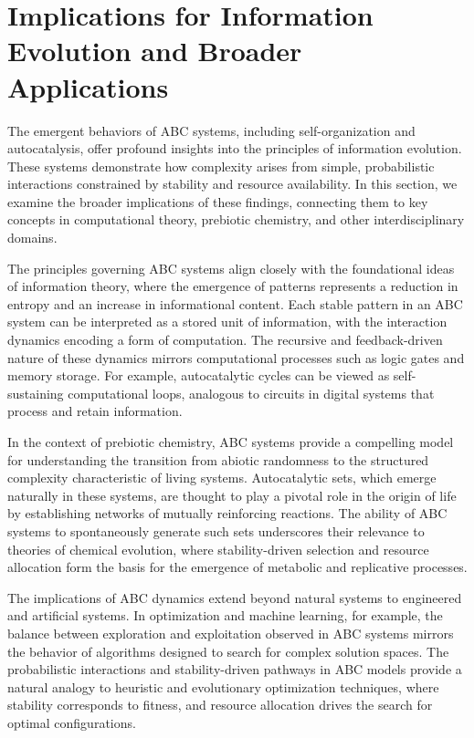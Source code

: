 \documentclass[%
 preprint, linenumbers,
 amsmath,amssymb,
 aps, physrev,
]{revtex4-2}
\begin{document}
\section{Implications for Information Evolution and Broader Applications}

The emergent behaviors of ABC systems, including self-organization and autocatalysis, offer profound insights into the principles of information evolution. These systems demonstrate how complexity arises from simple, probabilistic interactions constrained by stability and resource availability. In this section, we examine the broader implications of these findings, connecting them to key concepts in computational theory, prebiotic chemistry, and other interdisciplinary domains.

The principles governing ABC systems align closely with the foundational ideas of information theory, where the emergence of patterns represents a reduction in entropy and an increase in informational content. Each stable pattern in an ABC system can be interpreted as a stored unit of information, with the interaction dynamics encoding a form of computation. The recursive and feedback-driven nature of these dynamics mirrors computational processes such as logic gates and memory storage. For example, autocatalytic cycles can be viewed as self-sustaining computational loops, analogous to circuits in digital systems that process and retain information.

In the context of prebiotic chemistry, ABC systems provide a compelling model for understanding the transition from abiotic randomness to the structured complexity characteristic of living systems. Autocatalytic sets, which emerge naturally in these systems, are thought to play a pivotal role in the origin of life by establishing networks of mutually reinforcing reactions. The ability of ABC systems to spontaneously generate such sets underscores their relevance to theories of chemical evolution, where stability-driven selection and resource allocation form the basis for the emergence of metabolic and replicative processes.

The implications of ABC dynamics extend beyond natural systems to engineered and artificial systems. In optimization and machine learning, for example, the balance between exploration and exploitation observed in ABC systems mirrors the behavior of algorithms designed to search for complex solution spaces. The probabilistic interactions and stability-driven pathways in ABC models provide a natural analogy to heuristic and evolutionary optimization techniques, where stability corresponds to fitness, and resource allocation drives the search for optimal configurations.
\end{document}
